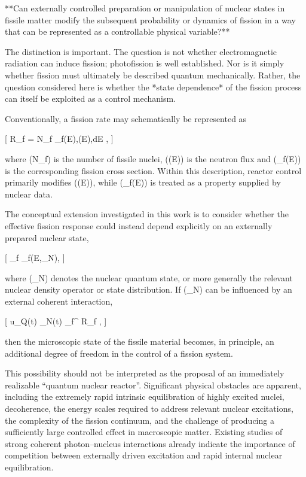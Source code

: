 **Can externally controlled preparation or manipulation of nuclear states in fissile matter modify the subsequent probability or dynamics of fission in a way that can be represented as a controllable physical variable?**

The distinction is important. The question is not whether electromagnetic radiation can induce fission; photofission is well established. Nor is it simply whether fission must ultimately be described quantum mechanically. Rather, the question considered here is whether the *state dependence* of the fission process can itself be exploited as a control mechanism.

Conventionally, a fission rate may schematically be represented as

[
R_f = N_f \int \sigma_f(E),\Phi(E),dE ,
]

where (N_f) is the number of fissile nuclei, (\Phi(E)) is the neutron flux and (\sigma_f(E)) is the corresponding fission cross section. Within this description, reactor control primarily modifies (\Phi(E)), while (\sigma_f(E)) is treated as a property supplied by nuclear data.

The conceptual extension investigated in this work is to consider whether the effective fission response could instead depend explicitly on an externally prepared nuclear state,

[
\sigma_f
\rightarrow
\sigma_f(E,\rho_N),
]

where (\rho_N) denotes the nuclear quantum state, or more generally the relevant nuclear density operator or state distribution. If (\rho_N) can be influenced by an external coherent interaction,

[
u_Q(t)
\longrightarrow
\rho_N(t)
\longrightarrow
\sigma_f^{}
\longrightarrow
R_f ,
]

then the microscopic state of the fissile material becomes, in principle, an additional degree of freedom in the control of a fission system.

This possibility should not be interpreted as the proposal of an immediately realizable “quantum nuclear reactor”. Significant physical obstacles are apparent, including the extremely rapid intrinsic equilibration of highly excited nuclei, decoherence, the energy scales required to address relevant nuclear excitations, the complexity of the fission continuum, and the challenge of producing a sufficiently large controlled effect in macroscopic matter. Existing studies of strong coherent photon–nucleus interactions already indicate the importance of competition between externally driven excitation and rapid internal nuclear equilibration.

